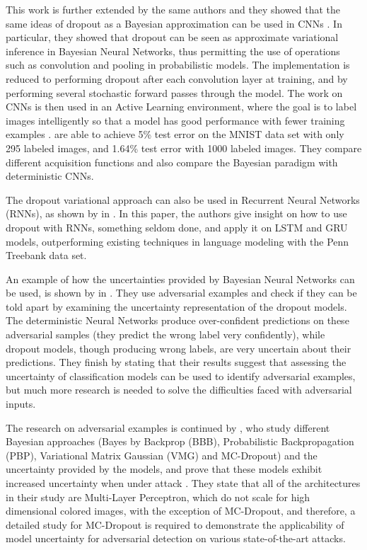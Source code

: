 This work is further extended by the same authors and they showed that the same ideas of dropout as a Bayesian approximation can be used in CNNs \cite{gal2015bayesian}. In particular, they showed that dropout can be seen as approximate variational inference in Bayesian Neural Networks, thus permitting the use of operations such as convolution and pooling in probabilistic models. The implementation is reduced to performing dropout after each convolution layer at training, and by performing several stochastic forward passes through the model. The work on CNNs is then used in an Active Learning environment, where the goal is to label images intelligently so that a model has good performance with fewer training examples \cite{Gal2016Active}. \citeauthor{Gal2016Active} are able to achieve 5\% test error on the MNIST data set with only 295 labeled images, and 1.64\% test error with 1000 labeled images. They compare different acquisition functions and also compare the Bayesian paradigm with deterministic CNNs.

The dropout variational approach can also be used in Recurrent Neural Networks (RNNs), as shown by \citeauthor{gal2016theoretically} in \cite{gal2016theoretically}. In this paper, the authors give insight on how to use dropout with RNNs, something seldom done, and apply it on LSTM and GRU models, outperforming existing techniques in language modeling with the Penn Treebank data set.

An example of how the uncertainties provided by Bayesian Neural Networks can be used, is shown by \citeauthor{li2017dropout} in \cite{li2017dropout}. They use adversarial examples and check if they can be told apart by examining the uncertainty representation of the dropout models. The deterministic Neural Networks produce over-confident predictions on these adversarial samples (they predict the wrong label very confidently), while dropout models, though producing wrong labels, are very uncertain about their predictions. They finish by stating that their results suggest that assessing the uncertainty of classification models can be used to identify adversarial examples, but much more research is needed to solve the difficulties faced with adversarial inputs.

The research on adversarial examples is continued by \citeauthor{rawat2017adversarial}, who study different Bayesian approaches (Bayes by Backprop (BBB), Probabilistic Backpropagation (PBP), Variational Matrix Gaussian (VMG) and MC-Dropout) and the uncertainty provided by the models, and prove that these models exhibit increased uncertainty when under attack \cite{rawat2017adversarial}. They state that all of the architectures in their study are Multi-Layer Perceptron, which do not scale for high dimensional colored images, with the exception of MC-Dropout, and therefore, a detailed study for MC-Dropout is required to demonstrate the applicability of model uncertainty for adversarial detection on various state-of-the-art attacks.

